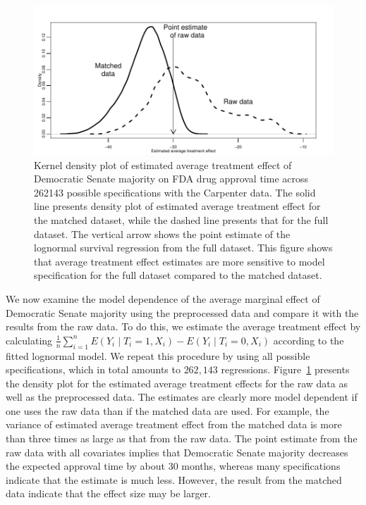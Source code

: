 \documentclass[11pt,titlepage]{article}
\begin{document}
\begin{figure}[t] 
 \begin{center}
    \includegraphics{figs/fdadens.pdf}
  \end{center}
  \vspace{-0.275in}
  \caption{Kernel density plot of estimated average treatment effect of
    Democratic Senate majority on FDA drug approval time across 262143
    possible specifications with the Carpenter data. The solid line
    presents density plot of estimated average treatment effect for
    the matched dataset, while the dashed line presents that for the
    full dataset.  The vertical arrow shows the point estimate of the
    lognormal survival regression from the full dataset.  This figure
    shows that average treatment effect estimates are more sensitive
    to model specification for the full dataset compared to the
    matched dataset.}
  \label{fg:fdadens}
\end{figure}

We now examine the model dependence of the average marginal effect of
Democratic Senate majority using the preprocessed data and compare it
with the results from the raw data.  To do this, we estimate the
average treatment effect by calculating $\frac{1}{n} \sum_{i=1}^n
E(Y_i \mid T_i = 1, X_i)-E(Y_i \mid T_i =0 ,X_i)$ according to the
fitted lognormal model. We repeat this procedure by using all possible
specifications, which in total amounts to $262,143$ regressions.
Figure~\ref{fg:fdadens} presents the density plot for the estimated
average treatment effects for the raw data as well as the preprocessed
data. The estimates are clearly more model dependent if one uses the
raw data than if the matched data are used. For example, the variance
of estimated average treatment effect from the matched data is more
than three times as large as that from the raw data. The point
estimate from the raw data with all covariates implies that Democratic
Senate majority decreases the expected approval time by about 30
months, whereas many specifications indicate that the estimate is much
less.  However, the result from the matched data indicate that the
effect size may be larger.
\end{document}
